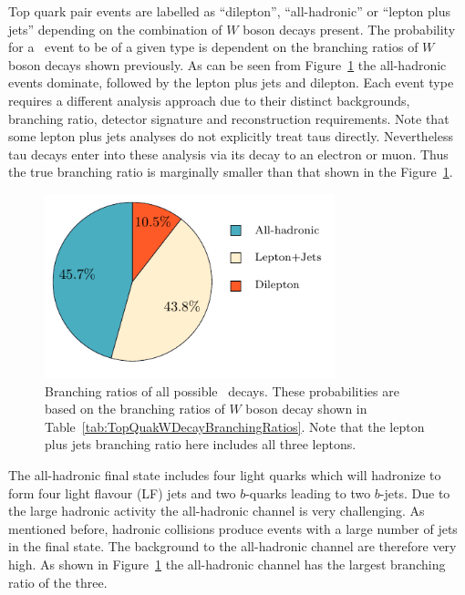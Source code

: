 Top quark pair events are labelled as ``dilepton'', ``all-hadronic'' or ``lepton plus jets'' depending on the combination of $W$ boson decays present. The probability for a \ttbar\ event to be of a given type is dependent on the branching ratios of $W$ boson decays shown previously. As can be seen from Figure~\ref{fig:TopQuarkDecayModes} the all-hadronic events dominate, followed by the lepton plus jets and dilepton. Each event type requires a different analysis approach due to their distinct backgrounds, branching ratio, detector signature and reconstruction requirements. Note that some lepton plus jets analyses do not explicitly treat taus directly. Nevertheless tau decays enter into these analysis via its decay to an electron or muon. Thus the true branching ratio is marginally smaller than that shown in the Figure~\ref{fig:TopQuarkDecayModes}.

\begin{figure}[tbhp]
  \centering
  \includegraphics[width=0.75\textwidth]{PartTopQuark/Diagrams/TopQuarkDecayPie.pdf}
  \caption[Branching ratios of all possible \ttbar\ decays.]{Branching ratios of all possible \ttbar\ decays. These probabilities are based on the branching ratios of $W$ boson decay shown in Table~\ref{tab:TopQuakWDecayBranchingRatios}. Note that the lepton plus jets branching ratio here includes all three leptons.}\label{fig:TopQuarkDecayModes}
\end{figure}

The all-hadronic final state includes four light quarks which will hadronize to form four light flavour (LF) jets and two $b$-quarks leading to two $b$-jets. Due to the large hadronic activity the all-hadronic channel is very challenging. As mentioned before, hadronic collisions produce events with a large number of jets in the final state. The background to the all-hadronic channel are therefore very high. As shown in Figure~\ref{fig:TopQuarkDecayModes} the all-hadronic channel has the largest branching ratio of the three.

